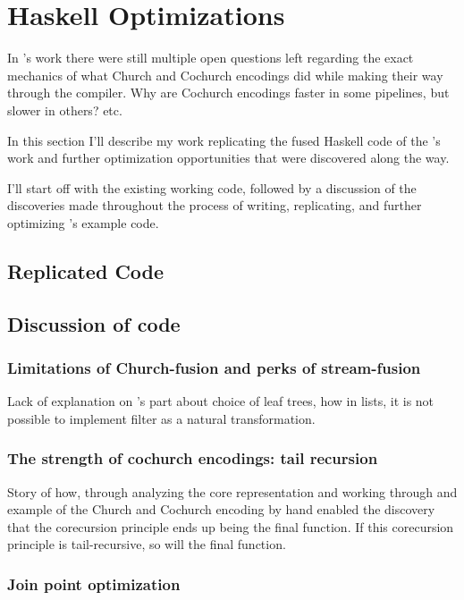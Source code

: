 
\section{Haskell Optimizations}\label{sec:haskell}
In \cite{Harper2011}'s work there were still multiple open questions left regarding the exact mechanics of what Church and Cochurch encodings did while making their way through the compiler. Why are Cochurch encodings faster in some pipelines, but slower in others? etc.

In this section I'll describe my work replicating the fused Haskell code of the \cite{Harper2011}'s work and further optimization opportunities that were discovered along the way.

I'll start off with the existing working code, followed by a discussion of the discoveries made throughout the process of writing, replicating, and further optimizing \cite{Harper2011}'s example code.

\subsection{Replicated Code}


\subsection{Discussion of code}
\subsubsection{Limitations of Church-fusion and perks of stream-fusion}\label{sec:tail}
Lack of explanation on \cite{Harper2011}'s part about choice of leaf trees, how in lists, it is not possible to implement filter as a natural transformation.
\subsubsection{The strength of cochurch encodings: tail recursion}
Story of how, through analyzing the core representation and working through and example of the Church and Cochurch encoding by hand enabled the discovery that the corecursion principle ends up being the final function.
If this corecursion principle is tail-recursive, so will the final function.
\subsubsection{Join point optimization}\label{sec:join}



\iffalse
One question that comes up is: Yes this fusion is nice, but how does the fused code actually provide a speedup, isn't the language already lazy and therefore not ripe for such a speedup? What are Haskell's other optimizations that come into play that pushes the shortcut fusion over the finish as a fast optimization?
\fi


